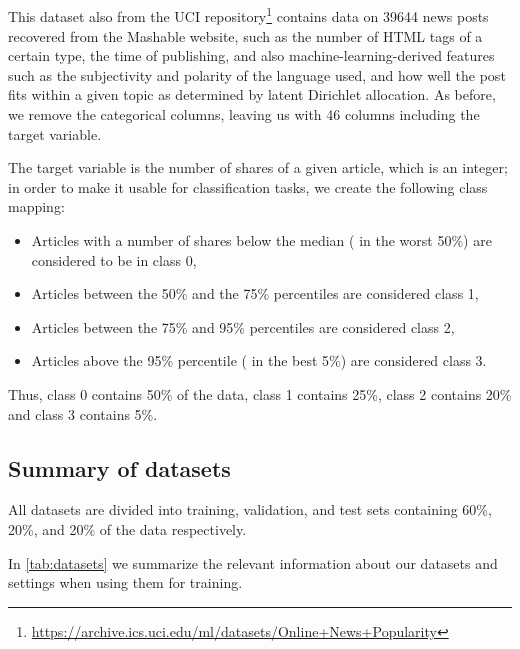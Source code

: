 \documentclass[../main.tex]{subfiles}
\begin{document}
\subsection{\OnlineNewsPopularity}

This dataset \cite{fernandesProactive2015} also from the UCI repository\footnote{\url{https://archive.ics.uci.edu/ml/datasets/Online+News+Popularity}} contains data on 39644 news posts recovered from the Mashable website, such as the number of HTML tags of a certain type, the time of publishing, and also machine-learning-derived features such as the subjectivity and polarity of the language used, and how well the post fits within a given topic as determined by latent Dirichlet allocation.
As before, we remove the categorical columns, leaving us with 46 columns including the target variable.

The target variable is the number of shares of a given article, which is an integer; in order to make it usable for classification tasks, we create the following class mapping:
\begin{itemize}
    \item Articles with a number of shares below the median (\ie{} in the worst 50\%) are considered to be in class 0,
    \item Articles between the 50\% and the 75\% percentiles are considered class 1,
    \item Articles between the 75\% and 95\% percentiles are considered class 2,
\item Articles above the 95\% percentile (\ie{} in the best 5\%) are considered class 3.
\end{itemize}
Thus, class 0 contains 50\% of the data, class 1 contains 25\%, class 2 contains 20\% and class 3 contains 5\%.

\subsection{Summary of datasets}

All datasets are divided into training, validation, and test sets containing 60\%, 20\%, and 20\% of the data respectively.

In \autoref{tab:datasets} we summarize the relevant information about our datasets and settings when using them for training.
\end{document}

